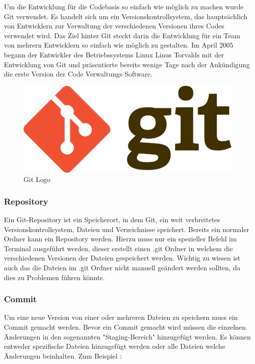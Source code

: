 Um die Entwicklung für die Codebasis so einfach wie möglich zu machen wurde Git verwendet. Es handelt sich um ein Versionskontrollsystem, das hauptsächlich von Entwicklern zur Verwaltung der verschiedenen Versionen ihres Codes verwendet wird. Das Ziel hinter Git steckt darin die Entwicklung für ein Team von mehrern Entwicklern so einfach wie möglich zu gestalten. Im April 2005 begann der Entwickler des Betriebssystems Linux Linus Torvalds mit der Entwicklung von Git und präsentierte bereits wenige Tage nach der Ankündigung die erste Version der Code Verwaltungs Software.

\begin{figure}[h!]
    \centering
    \includegraphics[width=0.5\linewidth]{pics/git-logo.png}
    \caption{Git Logo}
    \label{fig:enter-label}
\end{figure}

\cite{Git}

\subsubsection{Repository}

Ein Git-Repository ist ein Speicherort, in dem Git, ein weit verbreitetes Versionskontrollsystem, Dateien und Verzeichnisse speichert. Bereits ein normaler Ordner kann ein Repository werden. Hierzu muss nur ein spezieller Befehl im Terminal ausgeführt werden, dieser erstellt einen .git Ordner in welchem die verschiedenen Versionen der Dateien gespeichert werden. Wichtig zu wissen ist auch das die Dateien im .git Ordner nicht manuell geändert werden sollten, da dies zu Problemen führen könnte.

\subsubsection{Commit}

Um eine neue Version von einer oder mehreren Dateien zu speichern muss ein Commit gemacht werden. Bevor ein Commit gemacht wird müssen die einzelnen Änderungen in den sogenannten "Staging-Bereich" hinzugefügt werden. Es können entweder spezifische Dateien hinzugefügt werden oder alle Dateien welche Änderungen beinhalten. Zum Beispiel :

